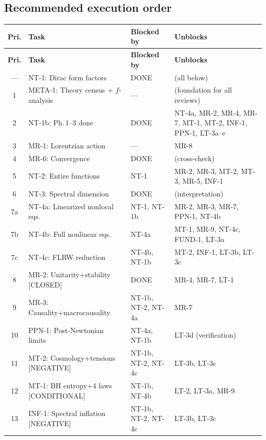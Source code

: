 \documentclass[12pt,a4paper]{article}
\begin{document}
\subsection{Recommended execution order}

\begin{longtable}{clp{3.2cm}p{4.5cm}}
\toprule
\textbf{Pri.} & \textbf{Task} & \textbf{Blocked by} & \textbf{Unblocks} \\
\midrule
\endfirsthead
\toprule
\textbf{Pri.} & \textbf{Task} & \textbf{Blocked by} & \textbf{Unblocks} \\
\midrule
\endhead
--- & \textcolor{proven}{NT-1: Dirac form factors} & \textcolor{proven}{DONE} & \textcolor{proven}{(all below)} \\
\midrule
1 & META-1: Theory census + $f$-analysis & --- & (foundation for all reviews) \\
2 & \textcolor{proven}{NT-1b: Ph.\,1--3 done} & \textcolor{proven}{DONE} & NT-4a, MR-2, MR-4, MR-7, MT-1, MT-2, INF-1, PPN-1, LT-3a--e \\
3 & MR-1: Lorentzian action & --- & MR-8 \\
4 & \textcolor{proven}{MR-6: Convergence} & \textcolor{proven}{DONE} & (cross-check) \\
5 & NT-2: Entire functions & NT-1 & MR-2, MR-3, MT-2, MT-3, MR-5, INF-1 \\
6 & \textcolor{proven}{NT-3: Spectral dimension} & \textcolor{proven}{DONE} & (interpretation) \\
7a & NT-4a: Linearized nonlocal eqs. & NT-1, NT-1b & MR-2, MR-3, MR-7, PPN-1, NT-4b \\
7b & NT-4b: Full nonlinear eqs. & NT-4a & MT-1, MR-9, NT-4c, FUND-1, LT-3a \\
7c & NT-4c: FLRW reduction & NT-4b, NT-1b & MT-2, INF-1, LT-3b, LT-3c \\
8 & \textcolor{proven}{MR-2: Unitarity+stability [CLOSED]} & \textcolor{proven}{DONE} & MR-4, MR-7, LT-1 \\
9 & MR-3: Causality+macrocausality & NT-1b, NT-2, NT-4a & MR-7 \\
10 & PPN-1: Post-Newtonian limits & NT-4a, NT-1b & LT-3d (verification) \\
11 & \textcolor{proven}{MT-2: Cosmology+tensions [NEGATIVE]} & NT-1b, NT-2, NT-4c & LT-3b, LT-3c \\
12 & \textcolor{near}{MT-1: BH entropy+4 laws [CONDITIONAL]} & NT-1b, NT-4b & LT-2, LT-3a, MR-9 \\
13 & \textcolor{long}{INF-1: Spectral inflation [NEGATIVE]} & NT-1b, NT-2, NT-4c & LT-3b, LT-3c \\

\end{longtable}
\end{document}

